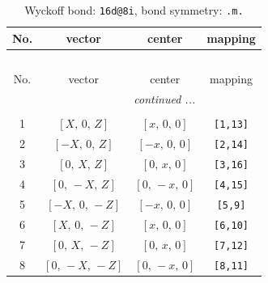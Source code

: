 \documentclass[fleqn,8pt]{jsarticle}
\begin{document}
\begin{longtable}{cccc}
\caption{Wyckoff bond: {\tt 16d@8i}, bond symmetry: {\tt .m.}}
 \\
 \hline \hline
No. & vector & center & mapping \\ \hline \endfirsthead

\multicolumn{3}{l}{\tablename\ \thetable{}} \\
 \hline \hline
No. & vector & center & mapping \\ \hline \endhead

 \hline \hline
\multicolumn{3}{r}{\footnotesize\it continued ...} \\ \endfoot

 \hline \hline
\multicolumn{3}{r}{} \\ \endlastfoot

1 & $\left[ X,\, 0,\, Z \right]$ & $\left[ x,\, 0,\, 0 \right]$ & {\tt [1,13]} \\ \hline
2 & $\left[ - X,\, 0,\, Z \right]$ & $\left[ - x,\, 0,\, 0 \right]$ & {\tt [2,14]} \\ \hline
3 & $\left[ 0,\, X,\, Z \right]$ & $\left[ 0,\, x,\, 0 \right]$ & {\tt [3,16]} \\ \hline
4 & $\left[ 0,\, - X,\, Z \right]$ & $\left[ 0,\, - x,\, 0 \right]$ & {\tt [4,15]} \\ \hline
5 & $\left[ - X,\, 0,\, - Z \right]$ & $\left[ - x,\, 0,\, 0 \right]$ & {\tt [5,9]} \\ \hline
6 & $\left[ X,\, 0,\, - Z \right]$ & $\left[ x,\, 0,\, 0 \right]$ & {\tt [6,10]} \\ \hline
7 & $\left[ 0,\, X,\, - Z \right]$ & $\left[ 0,\, x,\, 0 \right]$ & {\tt [7,12]} \\ \hline
8 & $\left[ 0,\, - X,\, - Z \right]$ & $\left[ 0,\, - x,\, 0 \right]$ & {\tt [8,11]} \\
\end{longtable}
\renewcommand{\arraystretch}{1.2}
\end{document}
